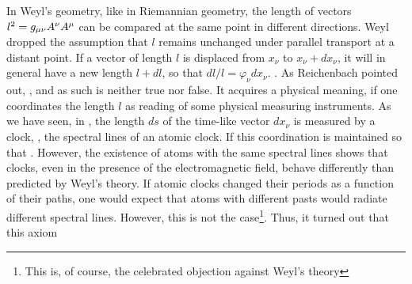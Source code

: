 \documentclass[draft]{article}
\newcommand{\phin}{\ensuremath{\varphi_\nu}\xspace}
\newcommand{\WT}{Weyl's theory\xspace}
\newcommand{\WG}{Weyl's geometry\xspace}
\begin{document}

\begin{W}
\item\label{W1} In \WG, like in Riemannian geometry, the length of vectors  $l^2=g_{\mu\nu} A^\nu A^\mu$ can be compared at the same point in different directions. Weyl dropped the assumption that $l$ remains unchanged under parallel transport at a distant point. If a vector of length $l$ is displaced from $x_\nu$ to $x_\nu+dx_\nu$, it will in general have a new length $l+dl$, so that $dl/l=\phin dx_\nu$. . As Reichenbach pointed out,  \citep[366]{Reichenbach1922a}, and as such is neither true nor false. It acquires a physical meaning, if one coordinates the length $l$ as reading of some physical measuring instruments. As we have seen, in \gr, the length $ds$ of the time-like vector $dx_\nu$ is measured by a clock, \eg, the spectral lines of an atomic clock. If this coordination is maintained so that  \citep[366]{Reichenbach1922a}. However, the existence of atoms with the same spectral lines shows that clocks, even in the presence of the electromagnetic field, behave differently than predicted by \WT. If atomic clocks changed their periods as a function of their \spti paths, one would expect that atoms with different pasts would radiate different spectral lines. However, this is not the case\footnote{This is, of course, the celebrated objection against \WT {}}. Thus, it turned out that this axiom   \citep[366]{Reichenbach1922a}


\end{W}
\end{document}
